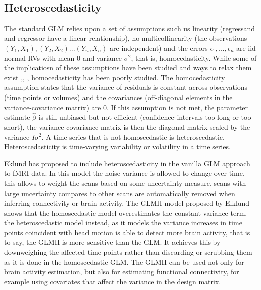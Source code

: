 \documentclass[10pt,letterpaper]{article}
\begin{document}
\\
  
\subsection*{Heteroscedasticity}

The standard GLM relies upon a set of assumptions such us linearity (regressand and regressor have a linear relationship), no multicollinearity (the observations $(Y_1,X_1), (Y_2,X_2)...(Y_n,X_n)$ are independent) and the errors $\epsilon_1, ..., \epsilon_n$ are iid normal RVs with mean 0 and variance $\sigma^2$, that is, homocedasticity. 
While some of the implicatiosn of these assumptions have been studied and ways to relax them exist  \cite{lund2006non},\citep{murphy2007long}, \citep{eklund2012does}, homocedasticity has been poorly studied. The homocedasticity assumption states that the variance of residuals is constant across observations (time points or volumes) and the covariances (off-diagonal elements in the variance-covariance matrix) are 0. If this assumption is not met, the parameter estimate $\hat{\beta}$ is still unbiased but not efficient (confidence intervals too long or too short), the variance covariance matrix is then the diagonal matrix scaled by the variance $I\sigma^2$.
A time series that is not homoscedastic is heteroscedastic. Heteroscedasticity is time-varying variability or volatility in a time series.

Eklund \citep{eklund2017bayesian} has proposed to include heteroscedasticity in the vanilla GLM approach to fMRI data. %
In this model the noise variance is allowed to change over time, this allows to weight the scans based on some uncertainty measure, scans with large uncertainty compares to other scans are automatically  removed when inferring connectivity or brain activity.
The GLMH model proposed by Elklund shows that the homoscedastic model overestimates the constant variance term, the heteroscedastic model instead, as it models the variance increases in time points coincident with head motion is able to detect more brain activity, that is to say, the GLMH is more sensitive than the GLM. It achieves this by downweighing the affected time points rather than discarding or scrubbing them as it is done in the homoscedastic GLM.
The GLMH can be used not  only for brain activity estimation, but also for estimating functional connectivity, for example using covariates that affect the variance in the design matrix. 
\end{document}
